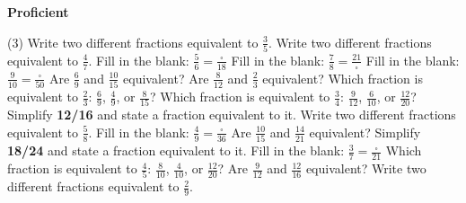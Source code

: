 \documentclass[17pt,a4paper,landscape]{extarticle}
\begin{document}
\sffamily
\boldmath

\boldmath

\boldmath

\boldmath

\boldmath

\boldmath

\boldmath

\boldmath

\boldmath

\boldmath

\boldmath

\boldmath

\boldmath

\boldmath

\boldmath

\boldmath

\boldmath

\boldmath

\boldmath

\boldmath

\boldmath

\boldmath

\vspace*{0.4em}
{\LARGE \textbf{Proficient}}
\begin{tasks}(3)
\task Write two different fractions equivalent to \mbox{$\frac{3}{5}$}.
\task Write two different fractions equivalent to \mbox{$\frac{4}{7}$}.
\task Fill in the blank: \mbox{$\frac{5}{6} = \frac{\square}{18}$}
\task Fill in the blank: \mbox{$\frac{7}{8} = \frac{21}{\square}$}
\task Fill in the blank: \mbox{$\frac{9}{10} = \frac{\square}{50}$}
\task Are \mbox{$\frac{6}{9}$} and \mbox{$\frac{10}{15}$} equivalent?
\task Are \mbox{$\frac{8}{12}$} and \mbox{$\frac{2}{3}$} equivalent?
\task Which fraction is equivalent to \mbox{$\frac{2}{3}$}: \mbox{$\frac{6}{9}$}, \mbox{$\frac{4}{9}$}, or \mbox{$\frac{8}{15}$}?
\task Which fraction is equivalent to \mbox{$\frac{3}{4}$}: \mbox{$\frac{9}{12}$}, \mbox{$\frac{6}{10}$}, or \mbox{$\frac{12}{20}$}?
\task Simplify \textbf{12/16} and state a fraction equivalent to it.
\task Write two different fractions equivalent to \mbox{$\frac{5}{8}$}.
\task Fill in the blank: \mbox{$\frac{4}{9} = \frac{\square}{36}$}
\task Are \mbox{$\frac{10}{15}$} and \mbox{$\frac{14}{21}$} equivalent?
\task Simplify \textbf{18/24} and state a fraction equivalent to it.
\task Fill in the blank: \mbox{$\frac{3}{7} = \frac{\square}{21}$}
\task Which fraction is equivalent to \mbox{$\frac{4}{5}$}: \mbox{$\frac{8}{10}$}, \mbox{$\frac{4}{10}$}, or \mbox{$\frac{12}{20}$}?
\task Are \mbox{$\frac{9}{12}$} and \mbox{$\frac{12}{16}$} equivalent?
\task Write two different fractions equivalent to \mbox{$\frac{2}{9}$}.
\end{tasks}
\end{document}
